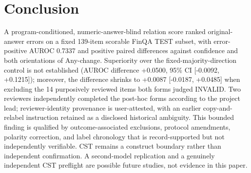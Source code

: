 \documentclass[11pt]{article}
\begin{document}
\section{Conclusion}
A program-conditioned, numeric-answer-blind relation score ranked original-answer errors on a fixed 139-item scorable FinQA TEST subset, with error-positive AUROC 0.7337 and positive paired differences against confidence and both orientations of Any-change. Superiority over the fixed-majority-direction control is not established (AUROC difference +0.0500, 95\% CI [-0.0092, +0.1215]); moreover, the difference shrinks to +0.0087 [-0.0187, +0.0485] when excluding the 14 purposively reviewed items both forms judged INVALID. Two reviewers independently completed the post-hoc forms according to the project lead; reviewer-identity provenance is user-attested, with an earlier copy-and-relabel instruction retained as a disclosed historical ambiguity. This bounded finding is qualified by outcome-associated exclusions, protocol amendments, polarity correction, and label chronology that is record-supported but not independently verifiable. CST remains a construct boundary rather than independent confirmation. A second-model replication and a genuinely independent CST preflight are possible future studies, not evidence in this paper.



\end{document}
